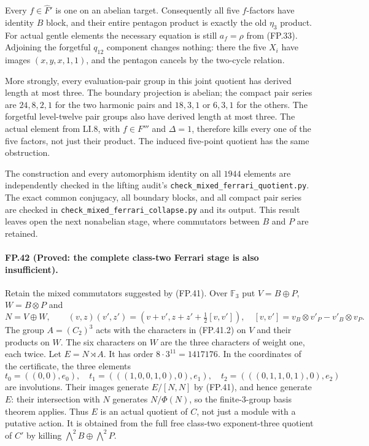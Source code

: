 Every $f\in\widehat F'$ is one on an abelian target.
Consequently all five $f$-factors have identity $B$ block,
and their entire pentagon product is exactly the old
$\eta_3$ product. For actual gentle elements the necessary
equation is still $a_f=\rho$ from (FP.33). Adjoining the
forgetful $q_{12}$ component changes nothing: there the
five $X_i$ have images $(x,y,x,1,1)$, and the pentagon
cancels by the two-cycle relation.

More strongly, every evaluation-pair group in this joint
quotient has derived length at most three. The boundary
projection is abelian; the compact pair series are
$24,8,2,1$ for the two harmonic pairs and
$18,3,1$ or $6,3,1$ for the others. The forgetful level-twelve
pair groups also have derived length at most three.
The actual element from LI.8, with $f\in F'''$ and
$\Delta=1$, therefore kills every one of the five factors,
not just their product. The induced five-point quotient has
the same obstruction.

The construction and every automorphism identity on all $1944$
elements are independently checked in the lifting audit's
\texttt{check\_mixed\_ferrari\_quotient.py}. The exact common
conjugacy, all boundary blocks, and all compact pair series
are checked in \texttt{check\_mixed\_ferrari\_collapse.py} and
its output. This result leaves open the next nonabelian
stage, where commutators between $B$ and $P$ are retained.

\paragraph{FP.42 (Proved: the complete class-two Ferrari stage is also insufficient).}
Retain the mixed commutators suggested by (FP.41). Over
$\mathbb F_3$ put $V=B\oplus P$, $W=B\otimes P$ and
\[
 N=V\oplus W,\qquad
 (v,z)(v',z')=(v+v',z+z'+\tfrac12[v,v']),
 \quad
 [v,v']=v_B\otimes v'_P-v'_B\otimes v_P.
 \tag{FP.42.1}
\]
The group $A=(C_2)^3$ acts with the characters in (FP.41.2)
on $V$ and their products on $W$. The six characters on $W$
are the three characters of weight one, each twice. Let
$E=N\rtimes A$. It has order $8\cdot3^{11}=1417176$.
In the coordinates of the certificate, the three elements
\[
 t_0=((0,0),e_0),\quad
 t_1=(((1,0,0,1,0),0),e_1),\quad
 t_2=(((0,1,1,0,1),0),e_2)
\]
are involutions. Their images generate $E/[N,N]$ by (FP.41),
and hence generate $E$: their intersection with $N$ generates
$N/\Phi(N)$, so the finite-$3$-group basis theorem applies.
Thus $E$ is an actual quotient of $C$, not just a module
with a putative action. It is obtained from the full free
class-two exponent-three quotient of $C'$ by killing
$\bigwedge^2B\oplus\bigwedge^2P$.

